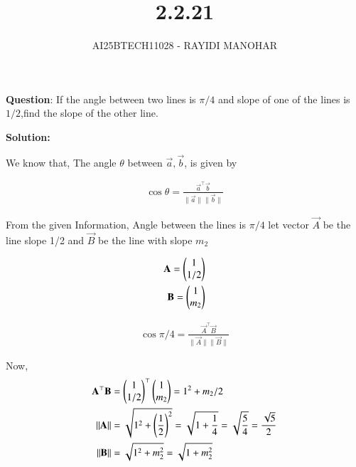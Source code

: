 \documentclass[journal]{IEEEtran}
\begin{document}

\vspace{3cm}

\title{2.2.21}
\author{AI25BTECH11028 - RAYIDI MANOHAR}
\maketitle
\bigskip
{\let\newpage\relax\maketitle}


\renewcommand{\thefigure}{\theenumi}
\renewcommand{\thetable}{\theenumi}
\setlength{\intextsep}{10pt} 


\renewcommand{\thetable}{\theenumi}


\textbf{Question}:
If the angle between two lines is $\pi/4$ and slope of one of the lines is $1/2$,find the slope of the other line.

\textbf{Solution:}

We know that,
The angle $\theta$ between $\vec{a},\vec{b}$, is given by 

\begin{align}
\cos \theta = \frac{\vec{a}^\top \vec{b}}{\|\vec{a}\| \|\vec{b}\|}
\end{align}


From the given Information,
Angle between the lines is $\pi/4$ 
let vector $\vec{A}$ be the line slope 1/2  and $\vec{B}$ be the line with slope $m_2$

\begin{align}
    \mathbf{A}=\begin{pmatrix}1\\1/2\end{pmatrix} \\
    \mathbf{B}=\begin{pmatrix}1\\m_2\end{pmatrix}
\end{align}

\begin{align}
    \cos{\pi/4} = \frac{\vec{A}^\top \vec{B}}{\|\vec{A}\| \|\vec{B}\|}
\end{align}

Now,
\begin{align}
       \mathbf{A}^\top \mathbf{B}&=\begin{pmatrix}1\\1/2\end{pmatrix}^\top \begin{pmatrix}1\\m_2\end{pmatrix}=1^2+m_2/2\\
\|\mathbf{A}\| &= \sqrt{1^2 + \left(\frac{1}{2}\right)^2} = \sqrt{1 + \frac{1}{4}} = \sqrt{\frac{5}{4}} = \frac{\sqrt{5}}{2} \\
\|\mathbf{B}\| &= \sqrt{1^2 + m_2^2} = \sqrt{1 + m_2^2}
\end{align}
\end{document}
